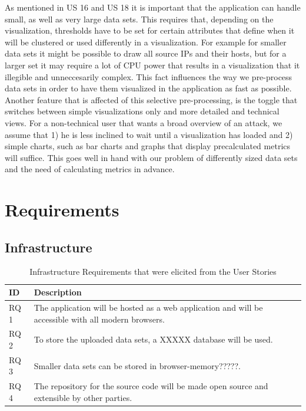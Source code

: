 As mentioned in US 16 and US 18 it is important that the application can handle small, as well as very large data sets. This requires that, depending on the visualization, thresholds have to be set for certain attributes that define when it will be clustered or used differently in a visualization. For example for smaller data sets it might be possible to draw all source IPs and their hosts, but for a larger set it may require a lot of CPU power that results in a visualization that it illegible and unneccesarily complex. This fact influences the way we pre-process data sets in order to have them visualized in the application as fast as possible. Another feature that is affected of this selective pre-processing, is the toggle that switches between simple visualizations only and more detailed and technical views. For a non-technical user that wants a broad overview of an attack, we assume that 1) he is less inclined to wait until a visualization has loaded and 2) simple charts, such as bar charts and graphs that display precalculated metrics will suffice. This goes well in hand with our problem of differently sized data sets and the need of calculating metrics in advance.


\section{Requirements}
\subsection{Infrastructure}
\begin{table}[]
\centering
\begin{tabular}{|p{1.1cm}|p{12cm}|}
\hline
\textbf{ID} & \textbf{Description} \\ \hline
RQ 1 & The application will be hosted as a web application and will be accessible with all modern browsers.\\ \hline
RQ 2 & To store the uploaded data sets, a XXXXX database will be used.\\ \hline
RQ 3 & Smaller data sets can be stored in browser-memory?????.\\ \hline
RQ 4 & The repository for the source code will be made open source and extensible by other parties.\\ \hline

\end{tabular}
\caption{Infrastructure Requirements that were elicited from the User Stories}
\label{table:2}
\end{table}


